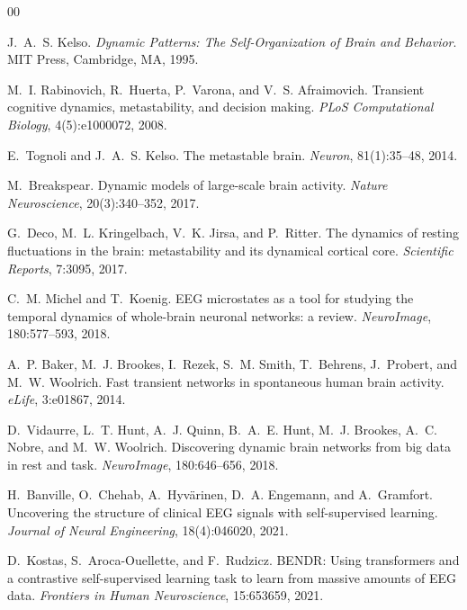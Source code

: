 \documentclass[5p,twocolumn,authoryear]{elsarticle}
\begin{document}
\begin{thebibliography}{00}

J.~A.~S. Kelso.
\newblock \emph{Dynamic Patterns: The Self-Organization of Brain and Behavior}.
\newblock MIT Press, Cambridge, MA, 1995.

M.~I. Rabinovich, R.~Huerta, P.~Varona, and V.~S. Afraimovich.
\newblock Transient cognitive dynamics, metastability, and decision making.
\newblock \emph{PLoS Computational Biology}, 4(5):e1000072, 2008.

E.~Tognoli and J.~A.~S. Kelso.
\newblock The metastable brain.
\newblock \emph{Neuron}, 81(1):35--48, 2014.

M.~Breakspear.
\newblock Dynamic models of large-scale brain activity.
\newblock \emph{Nature Neuroscience}, 20(3):340--352, 2017.

G.~Deco, M.~L. Kringelbach, V.~K. Jirsa, and P.~Ritter.
\newblock The dynamics of resting fluctuations in the brain: metastability and its dynamical cortical core.
\newblock \emph{Scientific Reports}, 7:3095, 2017.

C.~M. Michel and T.~Koenig.
\newblock EEG microstates as a tool for studying the temporal dynamics of whole-brain neuronal networks: a review.
\newblock \emph{NeuroImage}, 180:577--593, 2018.

A.~P. Baker, M.~J. Brookes, I.~Rezek, S.~M. Smith, T.~Behrens, J.~Probert, and M.~W. Woolrich.
\newblock Fast transient networks in spontaneous human brain activity.
\newblock \emph{eLife}, 3:e01867, 2014.

D.~Vidaurre, L.~T. Hunt, A.~J. Quinn, B.~A.~E. Hunt, M.~J. Brookes, A.~C. Nobre, and M.~W. Woolrich.
\newblock Discovering dynamic brain networks from big data in rest and task.
\newblock \emph{NeuroImage}, 180:646--656, 2018.

H.~Banville, O.~Chehab, A.~Hyv{\"a}rinen, D.~A. Engemann, and A.~Gramfort.
\newblock Uncovering the structure of clinical EEG signals with self-supervised learning.
\newblock \emph{Journal of Neural Engineering}, 18(4):046020, 2021.

D.~Kostas, S.~Aroca-Ouellette, and F.~Rudzicz.
\newblock BENDR: Using transformers and a contrastive self-supervised learning task to learn from massive amounts of EEG data.
\newblock \emph{Frontiers in Human Neuroscience}, 15:653659, 2021.


\end{thebibliography}
\end{document}
